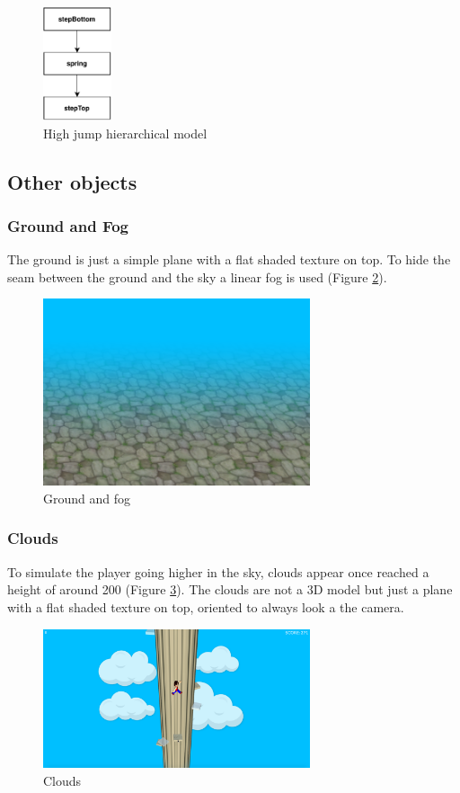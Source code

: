 \documentclass[12pt]{article}
\begin{document}
\begin{figure}[h]
\centering
\includegraphics[width=0.18\textwidth]{springStep}
\caption{High jump hierarchical model}
\label{fig:sprintStep}
\end{figure}

\newpage

\subsection{Other objects}
\subsubsection{Ground and Fog}
The ground is just a simple plane with a flat shaded texture on top. To hide the seam between the ground and the sky a linear fog is used (Figure \ref{fig:ground-fog}).

\begin{figure}[h]
\centering
\includegraphics[width=0.7\textwidth]{ground-fog}
\caption{Ground and fog}
\label{fig:ground-fog}
\end{figure}

\subsubsection{Clouds}
To simulate the player going higher in the sky, clouds appear once reached a height of around 200 (Figure \ref{fig:clouds}). The clouds are not a 3D model but just a plane with a flat shaded texture on top, oriented to always look a the camera.
\begin{figure}[h]
\centering
\includegraphics[width=0.7\textwidth]{clouds}
\caption{Clouds}
\label{fig:clouds}
\end{figure}
\end{document}
